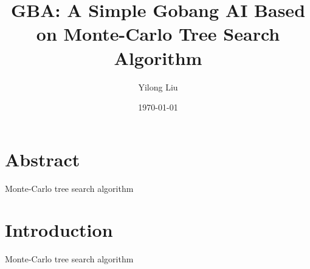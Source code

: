 \documentclass[UTF8]{ctexart}
\title{GBA: A Simple Gobang AI Based on Monte-Carlo Tree Search Algorithm}
\author{Yilong Liu}
\date{\today}
\begin{document}
\maketitle
\newpage
\tableofcontents
\newpage

\section*{Abstract}
Monte-Carlo tree search algorithm

\section{Introduction}
Monte-Carlo tree search algorithm
\end{document}

